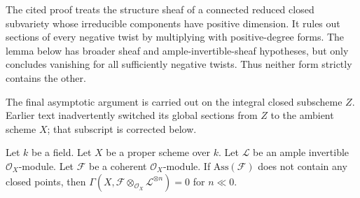 \begin{lemma}
\label{lemma-vanishin-h0-negative}
\begin{reference}
\cite[Chapter III, \S 5, no. 77, proof of Proposition 4,
p. 272]{FAC}
\end{reference}
\begin{history}
The cited proof treats the structure sheaf of a connected reduced closed
subvariety whose irreducible components have positive dimension. It rules out
sections of every negative twist by multiplying with positive-degree forms.
The lemma below has broader sheaf and ample-invertible-sheaf hypotheses, but
only concludes vanishing for all sufficiently negative twists. Thus neither
form strictly contains the other.

The final asymptotic argument is carried out on the integral closed subscheme
$Z$. Earlier text inadvertently switched its global sections from $Z$ to the
ambient scheme $X$; that subscript is corrected below.
\end{history}
Let $k$ be a field. Let $X$ be a proper scheme over $k$. Let $\mathcal{L}$
be an ample invertible $\mathcal{O}_X$-module. Let $\mathcal{F}$ be a
coherent $\mathcal{O}_X$-module. If $\text{Ass}(\mathcal{F})$ does not
contain any closed points, then
$\Gamma(X, \mathcal{F} \otimes_{\mathcal{O}_X} \mathcal{L}^{\otimes n}) = 0$
for $n \ll 0$.
\end{lemma}


